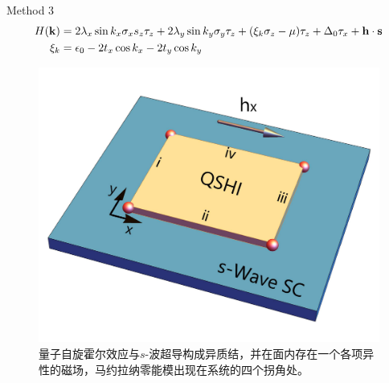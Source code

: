 \documentclass[10pt,aspectratio=169]{beamer} %
\begin{document}
\begin{frame}{Method 3}
\begin{equation}
\begin{aligned}
H(\mathbf{k})&=2\lambda_x\sin k_x\sigma_xs_z\tau_z+2\lambda_y\sin k_y\sigma_y\tau_z+(\xi_k\sigma_z-\mu)\tau_z+\Delta_0\tau_x+{\bf h\cdot s}\\
\xi_k&=\epsilon_0-2t_x\cos k_x-2t_y\cos k_y\label{ze1}
\end{aligned}
\end{equation}
\begin{figure}[h]
	\centering
	\includegraphics[scale=0.1]{pic/fig14.pdf}
	\caption{量子自旋霍尔效应与$s$-波超导构成异质结，并在面内存在一个各项异性的磁场，马约拉纳零能模出现在系统的四个拐角处。}\label{fig13}
\end{figure}
\end{frame}
\end{document}
